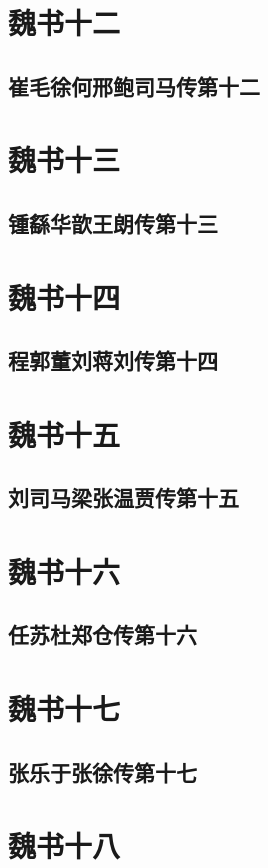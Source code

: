 \documentclass[12pt,UTF8]{ctexbook}
\begin{document}
\part{魏书十二}
\chapter{崔毛徐何邢鲍司马传第十二}

\part{魏书十三}
\chapter{锺繇华歆王朗传第十三}

\part{魏书十四}
\chapter{程郭董刘蒋刘传第十四}

\part{魏书十五}
\chapter{刘司马梁张温贾传第十五}

\part{魏书十六}
\chapter{任苏杜郑仓传第十六}

\part{魏书十七}
\chapter{张乐于张徐传第十七}

\part{魏书十八}
\end{document}
